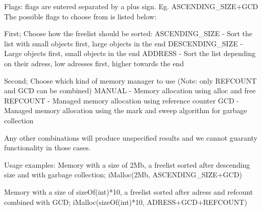 \documentclass{article}
\begin{document}
Flags: flags are entered separated by a plus sign. Eg. ASCENDING\_SIZE+GCD
The possible flags to choose from is listed below:

First; Choose how the freelist should be sorted:
ASCENDING\_SIZE - Sort the list with small objects first, large objects in the end
DESCENDING\_SIZE - Large objects first, small objects in the end
ADDRESS - Sort the list depending on their adress, low adresses first, higher towards the end

Second; Choose which kind of memory manager to use (Note: only REFCOUNT and GCD can be combined)
MANUAL -  Memory allocation using alloc and free
REFCOUNT - Managed memory allocation using reference counter
GCD - Managed memory allocation using the mark and sweep algorithm for garbage collection

Any other combinations will produce unspecified results and we cannot guaranty functionality
in those cases.

Usage examples:
Memory with a size of 2Mb, a freelist sorted after descending size and with garbage collection;
iMalloc(2Mb, ASCENDING\_SIZE+GCD)

Memory with a size of sizeOf(int)*10, a freelist sorted after adress and refcount combined with GCD;
iMalloc(sizeOf(int)*10, ADRESS+GCD+REFCOUNT)
\end{document}

